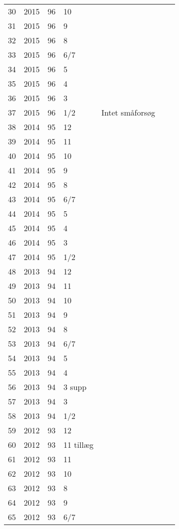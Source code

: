 \begin{longtable}{ |l|l|l|l|l|l|l| }
30 & 2015 & 96 & 10 &  &  &  \\
31 & 2015 & 96 & 9 &  &  &  \\
32 & 2015 & 96 & 8 &  &  &  \\
33 & 2015 & 96 & 6/7 &  &  &  \\
34 & 2015 & 96 & 5 &  &  &  \\
35 & 2015 & 96 & 4 &  &  &  \\
36 & 2015 & 96 & 3 &  &  &  \\
37 & 2015 & 96 & 1/2 & Intet småforsøg &  &  \\
38 & 2014 & 95 & 12 &  &  &  \\
39 & 2014 & 95 & 11 &  &  &  \\
40 & 2014 & 95 & 10 &  &  &  \\
41 & 2014 & 95 & 9 &  &  &  \\
42 & 2014 & 95 & 8 &  &  &  \\
43 & 2014 & 95 & 6/7 &  &  &  \\
44 & 2014 & 95 & 5 &  &  &  \\
45 & 2014 & 95 & 4 &  &  &  \\
46 & 2014 & 95 & 3 &  &  &  \\
47 & 2014 & 95 & 1/2 &  &  &  \\
48 & 2013 & 94 & 12 &  &  &  \\
49 & 2013 & 94 & 11 &  &  &  \\
50 & 2013 & 94 & 10 &  &  &  \\
51 & 2013 & 94 & 9 &  &  &  \\
52 & 2013 & 94 & 8 &  &  &  \\
53 & 2013 & 94 & 6/7 &  &  &  \\
54 & 2013 & 94 & 5 &  &  &  \\
55 & 2013 & 94 & 4 &  &  &  \\
56 & 2013 & 94 & 3 supp &  &  &  \\
57 & 2013 & 94 & 3 &  &  &  \\
58 & 2013 & 94 & 1/2 &  &  &  \\
59 & 2012 & 93 & 12 &  &  &  \\
60 & 2012 & 93 & 11 tillæg &  &  &  \\
61 & 2012 & 93 & 11 &  &  &  \\
62 & 2012 & 93 & 10 &  &  &  \\
63 & 2012 & 93 & 8 &  &  &  \\
64 & 2012 & 93 & 9 &  &  &  \\
65 & 2012 & 93 & 6/7 &  &  &  \\

\end{longtable}
